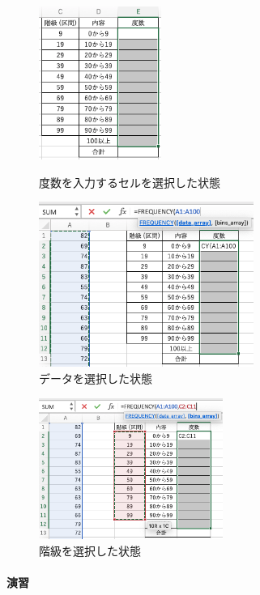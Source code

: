 \begin{figure}[htbp]
    \begin{minipage}{0.5\hsize}
        \centering
        \includegraphics[width=4cm]{chap1/select_cells_freq.png}
        \caption{度数を入力するセルを選択した状態}
        \label{fig:select_cells_freq}
    \end{minipage}
    \begin{minipage}{0.5\hsize}
        \centering
        \includegraphics[width=7cm]{chap1/select_data_freq.png}
        \caption{データを選択した状態}
        \label{fig:select_data_freq}
    \end{minipage}
\end{figure}

\begin{figure}[htbp]
    \centering
    \includegraphics[width=6cm]{chap1/select_classes_freq.png}
    \caption{階級を選択した状態}
    \label{fig:select_classes_freq}
\end{figure}

\paragraph{演習}

